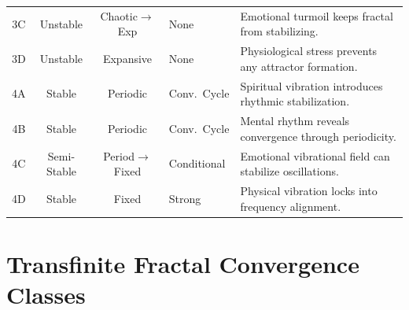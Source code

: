 \begin{longtable}{c|c|c|p{2cm}|p{5cm}}
3C & Unstable & Chaotic$\to$Exp & None &
Emotional turmoil keeps fractal from stabilizing. \\

3D & Unstable & Expansive & None &
Physiological stress prevents any attractor formation. \\
\midrule

4A & Stable & Periodic & Conv.\ Cycle &
Spiritual vibration introduces rhythmic stabilization. \\

4B & Stable & Periodic & Conv.\ Cycle &
Mental rhythm reveals convergence through periodicity. \\

4C & Semi-Stable & Period$\to$Fixed & Conditional &
Emotional vibrational field can stabilize oscillations. \\

4D & Stable & Fixed & Strong &
Physical vibration locks into frequency alignment. \\

\end{longtable}
\normalsize

\section{Transfinite Fractal Convergence Classes}

